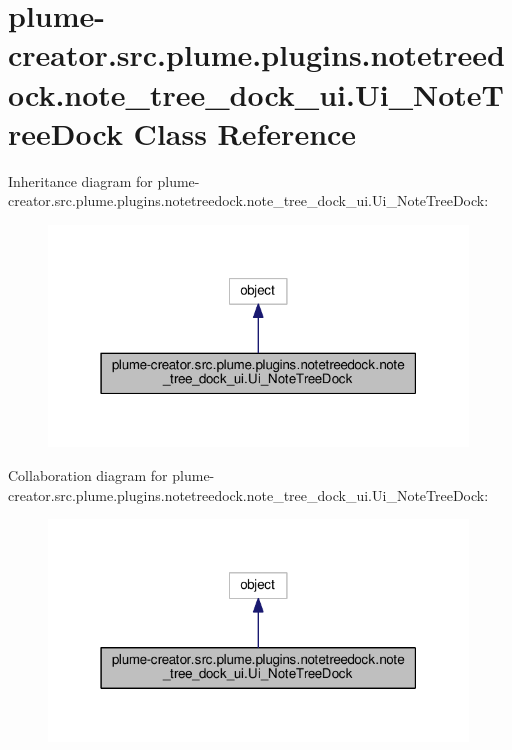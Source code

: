 \hypertarget{classplume-creator_1_1src_1_1plume_1_1plugins_1_1notetreedock_1_1note__tree__dock__ui_1_1_ui___note_tree_dock}{}\section{plume-\/creator.src.\+plume.\+plugins.\+notetreedock.\+note\+\_\+tree\+\_\+dock\+\_\+ui.\+Ui\+\_\+\+Note\+Tree\+Dock Class Reference}
\label{classplume-creator_1_1src_1_1plume_1_1plugins_1_1notetreedock_1_1note__tree__dock__ui_1_1_ui___note_tree_dock}


Inheritance diagram for plume-\/creator.src.\+plume.\+plugins.\+notetreedock.\+note\+\_\+tree\+\_\+dock\+\_\+ui.\+Ui\+\_\+\+Note\+Tree\+Dock\+:\nopagebreak
\begin{figure}[H]
\begin{center}
\leavevmode
\includegraphics[width=316pt]{classplume-creator_1_1src_1_1plume_1_1plugins_1_1notetreedock_1_1note__tree__dock__ui_1_1_ui___note_tree_dock__inherit__graph}
\end{center}
\end{figure}


Collaboration diagram for plume-\/creator.src.\+plume.\+plugins.\+notetreedock.\+note\+\_\+tree\+\_\+dock\+\_\+ui.\+Ui\+\_\+\+Note\+Tree\+Dock\+:\nopagebreak
\begin{figure}[H]
\begin{center}
\leavevmode
\includegraphics[width=316pt]{classplume-creator_1_1src_1_1plume_1_1plugins_1_1notetreedock_1_1note__tree__dock__ui_1_1_ui___note_tree_dock__coll__graph}
\end{center}
\end{figure}
